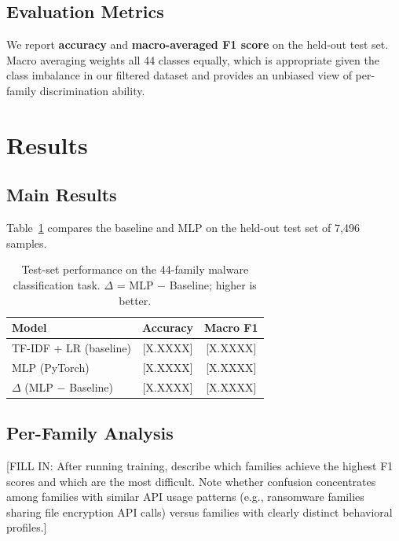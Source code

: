 \documentclass[11pt]{article}
\begin{document}
\subsection{Evaluation Metrics}

We report \textbf{accuracy} and \textbf{macro-averaged F1 score} on
the held-out test set. Macro averaging weights all 44 classes equally,
which is appropriate given the class imbalance in our filtered dataset
and provides an unbiased view of per-family discrimination ability.

\section{Results}
\label{sec:results}

\subsection{Main Results}

Table~\ref{tab:results} compares the baseline and MLP on the
held-out test set of 7,496 samples.

\begin{table}[h]
\centering
\small
\begin{tabular}{lcc}
\toprule
\textbf{Model}       & \textbf{Accuracy} & \textbf{Macro F1} \\
\midrule
TF-IDF + LR (baseline) & [X.XXXX]        & [X.XXXX]          \\
MLP (PyTorch)          & [X.XXXX]        & [X.XXXX]          \\
\midrule
$\Delta$ (MLP $-$ Baseline) & [X.XXXX]   & [X.XXXX]          \\
\bottomrule
\end{tabular}
\caption{Test-set performance on the 44-family malware classification task.
         $\Delta$ = MLP $-$ Baseline; higher is better.}
\label{tab:results}
\end{table}

\subsection{Per-Family Analysis}

[FILL IN: After running training, describe which families achieve the
highest F1 scores and which are the most difficult. Note whether
confusion concentrates among families with similar API usage patterns
(e.g., ransomware families sharing file encryption API calls) versus
families with clearly distinct behavioral profiles.]
\end{document}
